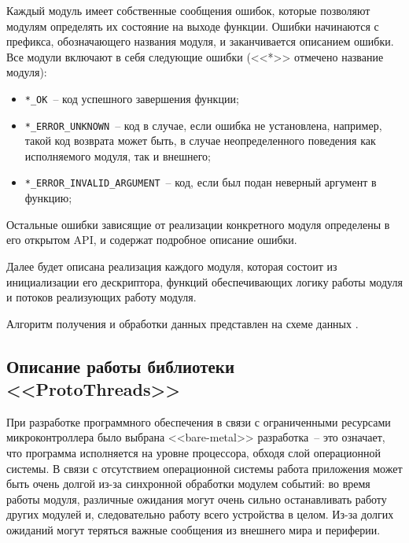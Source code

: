Каждый модуль имеет собственные сообщения ошибок, которые позволяют модулям определять их состояние на выходе функции.
Ошибки начинаются с префикса, обозначающего названия модуля, и заканчивается описанием ошибки. Все модули включают в себя следующие
ошибки (<<*>> отмечено название модуля):

\begin{itemize}
    \item \lstinline{*_OK}~-- код успешного завершения функции;
    \item \lstinline{*_ERROR_UNKNOWN}~-- код в случае, если ошибка не установлена, например, 
    такой код возврата может быть, в случае неопределенного поведения как исполняемого модуля, так и внешнего;
    \item \lstinline{*_ERROR_INVALID_ARGUMENT}~-- код, если был подан неверный аргумент в функцию;
\end{itemize}

Остальные ошибки зависящие от реализации конкретного модуля определены в его открытом API, и содержат подробное описание ошибки.

Далее будет описана реализация каждого модуля, которая состоит из инициализации его дескриптора, функций обеспечивающих логику работы модуля
и потоков реализующих работу модуля.

Алгоритм получения и обработки данных представлен на схеме
данных \dataScheme. 

\subsection{Описание работы библиотеки <<ProtoThreads>>}
При разработке программного обеспечения в связи с ограниченными ресурсами микроконтроллера было выбрана <<bare-metal>>
разработка~-- это означает, что программа исполняется на уровне процессора, обходя слой операционной системы.
В связи с отсутствием операционной системы работа приложения может быть очень долгой из-за синхронной обработки модулем событий:
во время работы модуля, различные ожидания могут очень сильно останавливать работу других модулей и, следовательно работу всего устройства в целом.
Из-за долгих ожиданий могут теряться важные сообщения из внешнего мира и периферии.

